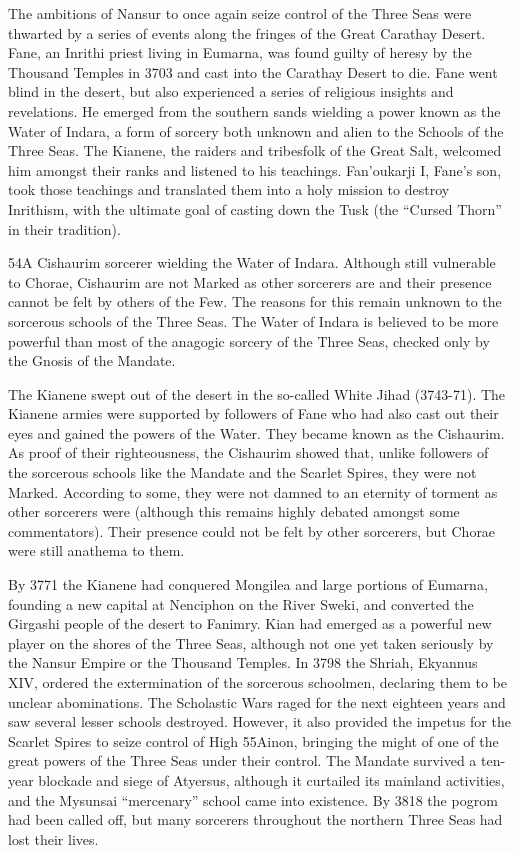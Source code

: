 \documentclass[]{book}
\begin{document}
The ambitions of Nansur to once again seize control of the Three Seas were thwarted
by a series of events along the fringes of the Great Carathay Desert. Fane, an Inrithi
priest living in Eumarna, was found guilty of heresy by the Thousand Temples in 3703
and cast into the Carathay Desert to die. Fane went blind in the desert, but also
experienced a series of religious insights and revelations. He emerged from the
southern sands wielding a power known as the Water of Indara, a form of sorcery both
unknown and alien to the Schools of the Three Seas. The Kianene, the raiders and
tribesfolk of the Great Salt, welcomed him amongst their ranks and listened to his
teachings. Fan'oukarji I, Fane's son, took those teachings and translated them into a
holy mission to destroy Inrithism, with the ultimate goal of casting down the Tusk (the
``Cursed Thorn'' in their tradition).

54A Cishaurim sorcerer wielding the Water of Indara. Although still vulnerable to Chorae, Cishaurim are
not Marked as other sorcerers are and their presence cannot be felt by others of the Few. The reasons for
this remain unknown to the sorcerous schools of the Three Seas. The Water of Indara is believed to be
more powerful than most of the anagogic sorcery of the Three Seas, checked only by the Gnosis of the
Mandate.

The Kianene swept out of the desert in the so-called White Jihad (3743-71). The
Kianene armies were supported by followers of Fane who had also cast out their eyes
and gained the powers of the Water. They became known as the Cishaurim. As proof
of their righteousness, the Cishaurim showed that, unlike followers of the sorcerous
schools like the Mandate and the Scarlet Spires, they were not Marked. According to
some, they were not damned to an eternity of torment as other sorcerers were (although
this remains highly debated amongst some commentators). Their presence could not be
felt by other sorcerers, but Chorae were still anathema to them.

By 3771 the Kianene had conquered Mongilea and large portions of Eumarna,
founding a new capital at Nenciphon on the River Sweki, and converted the Girgashi
people of the desert to Fanimry. Kian had emerged as a powerful new player on the
shores of the Three Seas, although not one yet taken seriously by the Nansur Empire or
the Thousand Temples. In 3798 the Shriah, Ekyannus XIV, ordered the extermination
of the sorcerous schoolmen, declaring them to be unclear abominations. The Scholastic
Wars raged for the next eighteen years and saw several lesser schools destroyed.
However, it also provided the impetus for the Scarlet Spires to seize control of High
55Ainon, bringing the might of one of the great powers of the Three Seas under their
control. The Mandate survived a ten-year blockade and siege of Atyersus, although it
curtailed its mainland activities, and the Mysunsai ``mercenary'' school came into
existence. By 3818 the pogrom had been called off, but many sorcerers throughout the
northern Three Seas had lost their lives.
\end{document}

